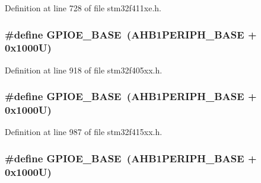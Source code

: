 Definition at line 728 of file stm32f411xe.\+h.

\subsubsection[{\texorpdfstring{G\+P\+I\+O\+E\+\_\+\+B\+A\+SE}{GPIOE_BASE}}]{\setlength{\rightskip}{0pt plus 5cm}\#define G\+P\+I\+O\+E\+\_\+\+B\+A\+SE~({\bf A\+H\+B1\+P\+E\+R\+I\+P\+H\+\_\+\+B\+A\+SE} + 0x1000\+U)}\hypertarget{group___peripheral__registers__structures_gab487b1983d936c4fee3e9e88b95aad9d}{}\label{group___peripheral__registers__structures_gab487b1983d936c4fee3e9e88b95aad9d}


Definition at line 918 of file stm32f405xx.\+h.

\subsubsection[{\texorpdfstring{G\+P\+I\+O\+E\+\_\+\+B\+A\+SE}{GPIOE_BASE}}]{\setlength{\rightskip}{0pt plus 5cm}\#define G\+P\+I\+O\+E\+\_\+\+B\+A\+SE~({\bf A\+H\+B1\+P\+E\+R\+I\+P\+H\+\_\+\+B\+A\+SE} + 0x1000\+U)}\hypertarget{group___peripheral__registers__structures_gab487b1983d936c4fee3e9e88b95aad9d}{}\label{group___peripheral__registers__structures_gab487b1983d936c4fee3e9e88b95aad9d}


Definition at line 987 of file stm32f415xx.\+h.

\subsubsection[{\texorpdfstring{G\+P\+I\+O\+E\+\_\+\+B\+A\+SE}{GPIOE_BASE}}]{\setlength{\rightskip}{0pt plus 5cm}\#define G\+P\+I\+O\+E\+\_\+\+B\+A\+SE~({\bf A\+H\+B1\+P\+E\+R\+I\+P\+H\+\_\+\+B\+A\+SE} + 0x1000\+U)}\hypertarget{group___peripheral__registers__structures_gab487b1983d936c4fee3e9e88b95aad9d}{}\label{group___peripheral__registers__structures_gab487b1983d936c4fee3e9e88b95aad9d}


